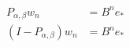 \documentclass{article}
\begin{document}
\begin{align*}
       P_{\alpha,\beta}w_n                &= B^n e_* \\
  (I-P_{\alpha,\beta})w_n                 &= B^n e_* \\
\end{align*}
\end{document}
